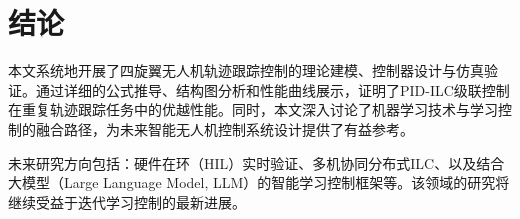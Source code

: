 \documentclass[12pt,hyperref,a4paper,UTF8]{ctexart}
\begin{document}
	\section{结论}
	本文系统地开展了四旋翼无人机轨迹跟踪控制的理论建模、控制器设计与仿真验证。通过详细的公式推导、结构图分析和性能曲线展示，证明了PID-ILC级联控制在重复轨迹跟踪任务中的优越性能。同时，本文深入讨论了机器学习技术与学习控制的融合路径，为未来智能无人机控制系统设计提供了有益参考\cite{ilc_review2024, deepilc2021, xu2020}。
	
	未来研究方向包括：硬件在环（HIL）实时验证、多机协同分布式ILC\cite{hock2016}、以及结合大模型（Large Language Model, LLM）的智能学习控制框架等。该领域的研究将继续受益于迭代学习控制的最新进展\cite{wei2025, adlakha2021, bhounsule202x, schoellig2012}。
	
	
	\newpage
	
	
	
\end{document}
